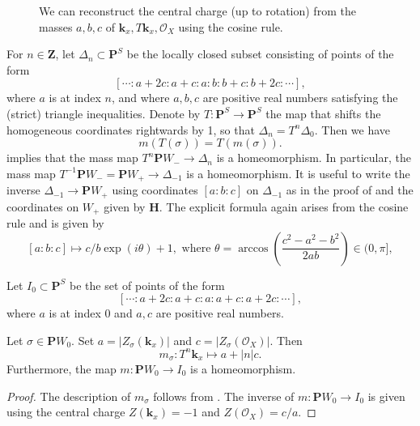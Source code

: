 \documentclass{amsart}
\begin{document}
\begin{figure}[ht]
  \centering
  \caption{We can reconstruct the central charge (up to rotation) from the masses \(a,b,c\) of \(\mathbf{k}_x, T\mathbf{k}_x, \mathcal{O}_X \) using the cosine rule.}
  \label{fig:cosrule}
\end{figure}

For \(n \in \mathbf{Z}\), let \(\Delta_n \subset \mathbf{P}^S\) be the locally closed subset consisting of points of the form
\[ [\cdots :a+2c:a+c:a:b:b+c:b+2c: \cdots],\]
where \(a\) is at index \(n\), and where \(a,b,c\) are positive real numbers satisfying the (strict) triangle inequalities.
Denote by \(T \colon \mathbf{P}^S \to \mathbf{P}^S\) the map that shifts the homogeneous coordinates rightwards by 1, so that \(\Delta_n = T^n \Delta_0\).
Then we have
\[ m (T (\sigma)) = T (m(\sigma)).\]
 implies that the mass map \(T^n \mathbf{P}W_- \to \Delta_n\) is a homeomorphism.
In particular, the mass map \(T^{-1} \mathbf{P}W_- = \mathbf{P}W_+ \to \Delta_{-1}\) is a homeomorphism.
It is useful to write the inverse \(\Delta_{-1} \to \mathbf{P}W_+\) using coordinates \([a:b:c]\) on \(\Delta_{-1}\) as in the proof of  and the coordinates on \(W_+\) given by \(\mathbf{H}\).
The explicit formula again arises from the cosine rule and is given by
\begin{equation}\label{eqn:inv+}
  [a:b:c] \mapsto c/b \exp(i \theta) + 1, \text{ where } \theta = \arccos \left( \frac{c^2-a^2-b^2}{2ab} \right) \in (0,\pi],
\end{equation}

Let \(I_0 \subset \mathbf{P}^S\) be the set of points of the form
\[ [\cdots : a+2c :a+c: a : a+c : a+2c :\cdots], \]
where \(a\) is at index 0 and \(a,c\) are positive real numbers.
\begin{proposition}
  Let \(\sigma \in \mathbf{P}W_0\).
  Set \(a = |Z_{\sigma}(\mathbf{k}_x)|\) and \(c = |Z_{\sigma}(\mathcal{O}_X)|\).
  Then
  \[ m_{\sigma} \colon T^{n} \mathbf{k}_x \mapsto a + |n| c.\]
  Furthermore, the map \(m \colon \mathbf{P}W_0 \to I_0\) is a homeomorphism.
\end{proposition}
\begin{proof}
  The description of \(m_{\sigma}\) follows from .
  The inverse of \(m \colon \mathbf{P}W_0 \to I_0\) is given using the central charge \(Z(\mathbf{k}_x) = -1\) and \(Z(\mathcal{O}_X) = c/a\).
\end{proof}
\end{document}
